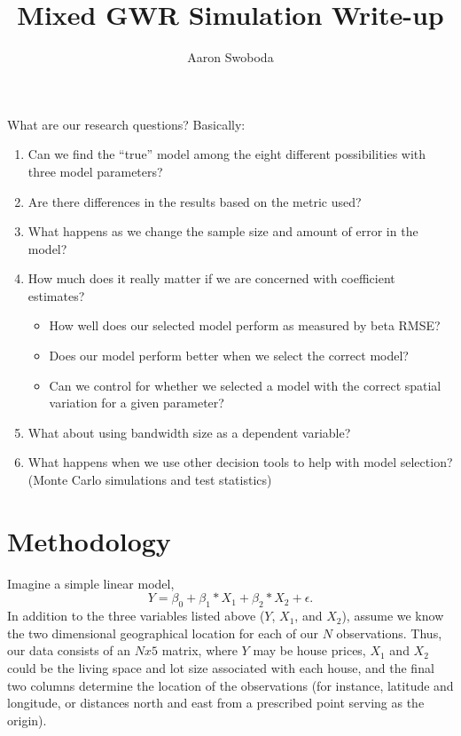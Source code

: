 \documentclass{article}\usepackage[]{graphicx}\usepackage[]{color}
\title{Mixed GWR Simulation Write-up}
\author{Aaron Swoboda}
\begin{document}
\maketitle

What are our research questions? Basically:
\begin{enumerate}
\item Can we find the ``true'' model among the eight different possibilities with three model parameters?
\item Are there differences in the results based on the metric used?
\item What happens as we change the sample size and amount of error in the model?
\item How much does it really matter if we are concerned with coefficient estimates?
  \begin{itemize}
  \item How well does our selected model perform as measured by beta RMSE?
  \item Does our model perform better when we select the correct model?
  \item Can we control for whether we selected a model with the correct spatial variation for a given parameter?
  \end{itemize}
\item What about using bandwidth size as a dependent variable?
\item What happens when we use other decision tools to help with model selection? (Monte Carlo simulations and test statistics)
\end{enumerate}





\section{Methodology}

Imagine a simple linear model,
\begin{equation}
Y = \beta _0 + \beta _1 *X_1 + \beta _2 * X_2 + \epsilon .
\end{equation}
In addition to the three variables listed above ($Y$, $X_1$, and $X_2$), assume we know the two dimensional geographical location for each of our $N$ observations. Thus, our data consists of an $N x 5$ matrix, where $Y$ may be house prices, $X_1$ and $X_2$ could be the living space and lot size associated with each house, and the final two columns determine the location of the observations (for instance, latitude and longitude, or distances north and east from a prescribed point serving as the origin).
\end{document}
